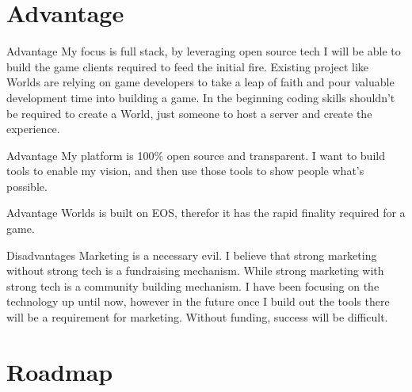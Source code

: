 \documentclass[final, ngerman, xcolor=pdftex, dvipsnames, table, aspectratio=169, 14pt]{beamer}
\begin{document}
\section{Advantage}
\begin{frame}{Advantage}
My focus is full stack, by leveraging open source tech I will be able to build the game clients required to feed the initial fire. Existing project like Worlds are relying on game developers to take a leap of faith and pour valuable development time into building a game. In the beginning coding skills shouldn't be required to create a World, just someone to host a server and create the experience. 
\end{frame}

\begin{frame}{Advantage}
My platform is 100\% open source and transparent. I want to build tools to enable my vision, and then use those tools to show people what's possible.
\end{frame}

\begin{frame}{Advantage}
Worlds is built on EOS, therefor it has the rapid finality required for a game. 
\end{frame}

\begin{frame}{Disadvantages}
Marketing is a necessary evil. I believe that strong marketing without strong tech is a fundraising mechanism. While strong marketing with strong tech is a community building mechanism. I have been focusing on the technology up until now, however in the future once I build out the tools there will be a requirement for marketing. Without funding, success will be difficult.  
\end{frame}

\section{Roadmap}
\end{document}
